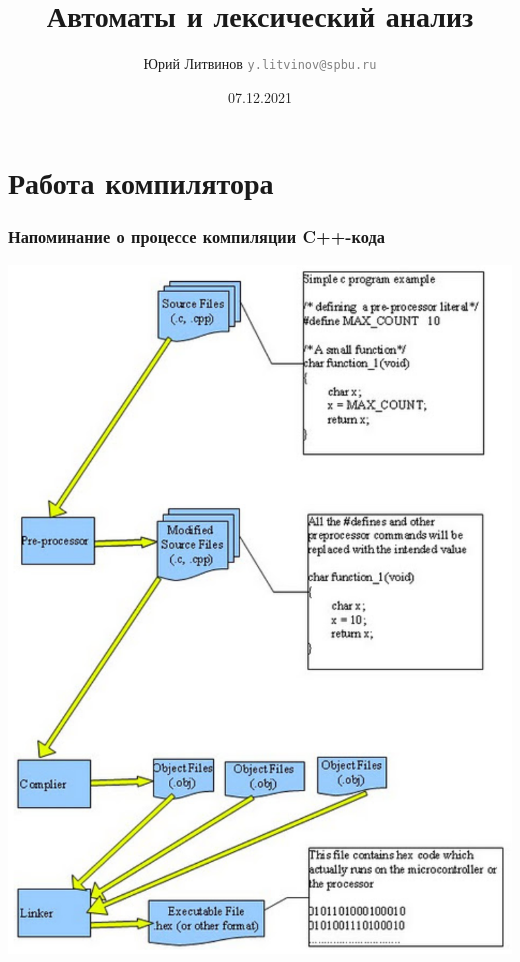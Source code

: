 \documentclass[xetex,mathserif,serif]{beamer}
\title{Автоматы и лексический анализ}
\author[Юрий Литвинов]{Юрий Литвинов \newline \textcolor{gray}{\small\texttt{y.litvinov@spbu.ru}}}
\date{07.12.2021}
\begin{document}
    
    \frame{\titlepage}

    \section{Работа компилятора}

    \begin{frame}
        \frametitle{Напоминание о процессе компиляции C++-кода}
        \begin{center}
            \includegraphics[height=0.8\textheight]{cppCompilation.png}
        \end{center}
    \end{frame}
\end{document}
